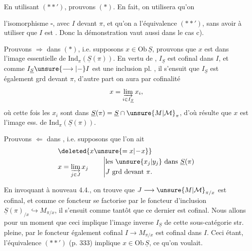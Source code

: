 En utilisant $(**')$, prouvons  $(*)$.  En fait, on utilisera  qu'on




l'isomorphisme $\square$, avec $I$  devant $\pi$, et qu'on a l'équivalence $(**')$, sans avoir à utiliser que $I$ est . Donc la démonstration vaut aussi dans le cas c).

Prouvons $\Longrightarrow$ dans $(*)$, i.e. supposons $x\in\mathrm{Ob}\,\underline S$, prouvons que $x$ est dans l'image essentielle de $\mathrm{Ind}_\pi(\underline S(\pi))$. En vertu de , $I_{\underline S}$ est cofinal dans $I$, et comme $I_{\underline S}\unsure{\longrightarrow|-}I$ est une inclusion pl. , il s'ensuit que $I_{\underline S}$ est également grd devant $\pi$, d'autre part on aura par cofinalité
\[
x=\varinjlim_{i\in I_{\underline S}}x_i,
\]
où cette fois les $x_i$ sont dans $\underline S(\pi)=\underline S\cap\unsure{M|\mathcal M}_\pi$, d'où résulte que $x$ est  l'image ess. de $\mathrm{Ind}_\pi(\underline S(\pi))$.

Prouvons $\Longleftarrow$ dans \unsure{$(*)$}, i.e. supposons que  l'on ait 
\[
\begin{aligned}
&\deleted{x\unsure{=x|\!-\!x}}\\[-2pt]
&x=\varinjlim_{j\in J}x_j\qquad
\left|\begin{aligned}&\text{les }\unsure{x_j|y_j}\text{ dans }\underline S(\pi)\\
&J\text{ grd devant }\pi.\end{aligned}\right.
\end{aligned}
\]



En invoquant à nouveau 4.4., on trouve que $J\longrightarrow\unsure{M|\mathcal M}_{\pi/x}$ est cofinal, et comme ce foncteur se factorise par le foncteur d'inclusion  $\underline S(\pi)_{/x}\hookrightarrow M_{\pi/x}$, il s'ensuit  comme tantôt que ce dernier est cofinal. Nous allons   pour un moment que ceci implique  l'image inverse $I_{\underline S}$ de cette sous-catégorie str. pleine, par le foncteur également cofinal $I\longrightarrow M_{\pi/x}$\unsure{;|,} est cofinal dans $I$. Ceci étant, l'équivalence $(**')$ (p. 333) implique $x\in\mathrm{Ob}\,\underline S$, ce qu'on voulait.

